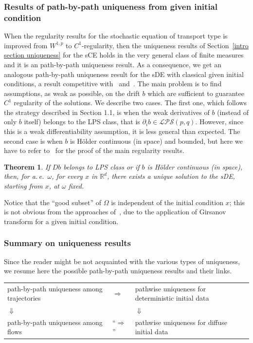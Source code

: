 \documentclass[a4paper,10pt]{article}
\newtheorem{theorem}{Theorem}
\newcommand{\mr}{\mathbb{R}}
\begin{document}
\subsubsection{Results of path-by-path uniqueness from given initial
condition}

When the regularity results for the stochastic equation of transport type is
improved from $W^{1,p}$ to $C^{1}$-regularity, then the uniqueness results
of Section~\ref{intro section uniqueness} for the sCE holds in the very
general class of finite measures and it is an path-by-path uniqueness
result. As a consequence, we get an analogous path-by-path uniqueness result
for the sDE with classical given initial conditions, a result competitive
with~\cite{DAVIE07} and~\cite{CATGUB13}. The main problem is to find assumptions, as
weak as possible, on the drift $b$ which are sufficient to guarantee $C^{1}$
regularity of the solutions. We describe two cases. The first one, which
follows the strategy described in Section 1.1, is when the weak derivatives
of $b$ (instead of only $b$ itself) belongs to the LPS class, that is 
$\partial _{i}b\in \mathcal{LPS}( p,q) $. However, since this is a
weak differentiability assumption, it is less general than expected. The
second case is when $b$ is H\"{o}lder continuous (in space) and bounded, but here we
have to refer to~\cite{FLAGUBPRI10,FlGuPr4} for the proof of the main
regularity results.


\begin{theorem}
If $Db$ belongs to LPS class or if $b$ is H\"older continuous (in space), then, for a.\,e.\ $\omega$, for every $x$ in $\mr^d$, there exists a unique solution to the sDE, starting from $x$, at $\omega$ fixed.
\end{theorem}

Notice that the ``good subset'' of $\Omega$ is independent of the initial condition $x$; this is not obvious from the approaches of~\cite{CATGUB13,DAVIE07}, due to the application of Girsanov transform for a given initial condition.

\subsubsection{Summary on uniqueness results}

Since the reader might be not acquainted with the various types of uniqueness, we resume here the possible path-by-path uniqueness results and their links.

\setlength{\extrarowheight}{5pt}
\begin{center}
\begin{tabular}{ >{\centering}m{4.5cm} >{\centering}m{2cm}  >{\centering}m{4.5cm} }
path-by-path uniqueness among trajectories & $\Rightarrow$ & pathwise uniqueness for deterministic initial data \tabularnewline
$\Downarrow$ &  \  &  $\Downarrow$ \tabularnewline
path-by-path uniqueness among flows & ``$\Rightarrow$'' & pathwise uniqueness for diffuse initial data
\end{tabular}
\end{center}
\end{document}
